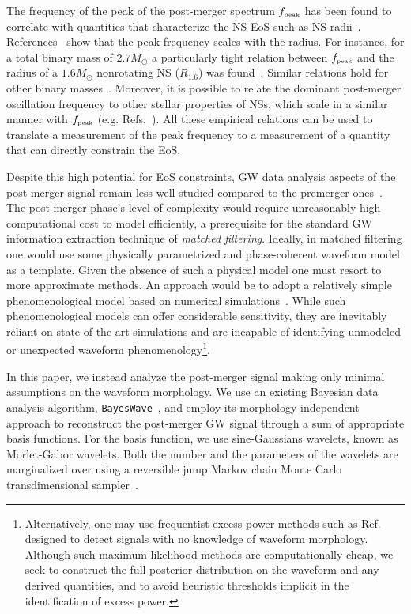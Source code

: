 \documentclass[aps,prd,amsmath,floats,floatfix, twocolumn,
superscriptaddress,nofootinbib,showpacs]{revtex4-1}
\newcommand{\peak}{{\mbox{\tiny peak}}}
\begin{document}
The frequency of the peak of the post-merger spectrum $f_{\peak}$ has been found to correlate with quantities that characterize the NS EoS such as NS radii~\cite{2012PhRvL.108a1101B,bauswein:12}. References~\cite{2012PhRvL.108a1101B,bauswein:12} show that the peak frequency scales with the radius. For instance, for a total binary mass of $2.7M_\odot$ a particularly tight relation between $f_{\peak}$ and the radius of a $1.6M_{\odot}$ nonrotating NS ($R_{1.6}$) was found~\cite{2012PhRvL.108a1101B}. Similar relations hold for other binary masses~\cite{2012PhRvL.108a1101B,bauswein:july15}. Moreover, it is possible to relate the dominant post-merger oscillation frequency to other stellar properties of NSs, which scale in a similar manner with $f_{\peak}$ (e.g. Refs.~\cite{bauswein:12,2014arXiv1412.3240T,2015arXiv150401764B}). All these empirical relations can be used to translate a measurement of the peak frequency to a measurement of a quantity that can directly constrain the EoS.

Despite this high potential for EoS constraints, GW data analysis aspects of the post-merger signal remain less well studied compared to the premerger ones~\cite{2014PhRvD..90f2004C,Clark:2015zxa,Bose:2017jvk,Yang:2017xlf}. The post-merger phase's level of complexity would require unreasonably high computational cost to model efficiently, a prerequisite for the standard GW information extraction technique of \emph{matched filtering}. Ideally, in matched filtering one would use some physically parametrized and phase-coherent waveform model as a template. Given the absence of such a physical model one must resort to more approximate methods. An approach would be to adopt a relatively simple phenomenological model based on numerical simulations~\cite{Clark:2015zxa,Bose:2017jvk}. While such phenomenological models can offer considerable sensitivity, they are inevitably reliant on state-of-the art simulations and are incapable of identifying unmodeled or unexpected waveform phenomenology\footnote{Alternatively, one may use frequentist excess power methods such as Ref.~\cite{Klimenko:2015ypf} designed to detect signals with no knowledge of waveform morphology.  Although such maximum-likelihood methods are computationally cheap, we seek to construct the full posterior distribution on the waveform and any derived quantities, and to avoid heuristic thresholds implicit in the identification of excess power.}.


In this paper, we instead analyze the post-merger signal making only minimal assumptions on the waveform morphology. We use an existing Bayesian data analysis algorithm, {\tt BayesWave}~\cite{Cornish:2014kda,Littenberg:2014oda}, and employ its morphology-independent approach to reconstruct the post-merger GW signal through a sum of appropriate basis functions. For the basis function, we use sine-Gaussians wavelets, known as Morlet-Gabor wavelets. Both the number and the parameters of the wavelets are marginalized over using a reversible jump Markov chain Monte Carlo transdimensional sampler~\cite{doi:10.1093/biomet/82.4.711}.
 
\end{document}
